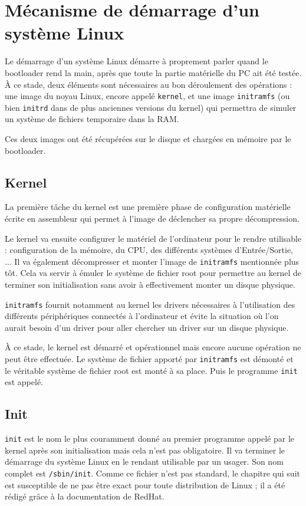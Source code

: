 \section{Mécanisme de démarrage d'un système Linux}
Le démarrage d'un système Linux démarre à proprement parler quand le bootloader rend la main, après que toute la partie matérielle du PC ait été testée. À ce stade, deux éléments sont nécessaires au bon déroulement des opérations : une image du noyau Linux, encore appelé \verb|kernel|, et une image \verb|initramfs| (ou bien \verb|initrd| dans de plus anciennes versions du kernel) qui permettra de simuler un système de fichiers temporaire dans la RAM. 

Ces deux images ont été récupérées sur le disque et chargées en mémoire par le bootloader.

\subsection{Kernel}
La première tâche du kernel est une première phase de configuration matérielle écrite en assembleur qui permet à l'image de déclencher sa propre décompression. 

Le kernel va ensuite configurer le matériel de l'ordinateur pour le rendre utilisable : configuration de la mémoire, du CPU, des différents systèmes d'Entrée/Sortie, ... Il va également décompresser et monter l'image de \verb|initramfs| mentionnée plus tôt. Cela va servir à émuler le système de fichier root pour permettre au kernel de terminer son initialisation sans avoir à effectivement monter un disque physique. 

\verb|initramfs| fournit notamment au kernel les drivers nécessaires à l'utilisation des différents périphériques connectés à l'ordinateur et évite la situation où l'on aurait besoin d'un driver pour aller chercher un driver sur un disque physique.

À ce stade, le kernel est démarré et opérationnel mais encore aucune opération ne peut être effectuée. Le système de fichier apporté par \verb|initramfs| est démonté et le véritable système de fichier root est monté à sa place. Puis le programme \verb|init| est appelé. 

\subsection{Init}
\verb|init| est le nom le plus couramment donné au premier programme appelé par le kernel après son initialisation mais cela n'est pas obligatoire. Il va terminer le démarrage du système Linux en le rendant utilisable par un usager. Son nom complet est \verb|/sbin/init|. Comme ce fichier n'est pas standard, le chapitre qui suit est susceptible de ne pas être exact pour toute distribution de Linux ; il a été rédigé grâce à la documentation de RedHat.

